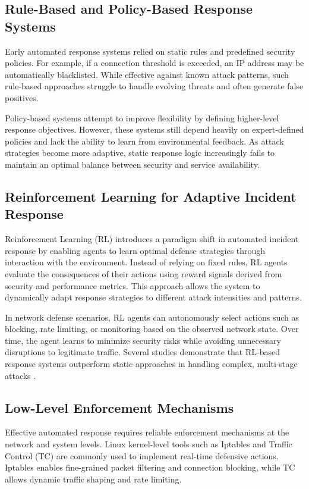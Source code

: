\documentclass[12pt,a4paper]{report}
\begin{document}
\subsection{Rule-Based and Policy-Based Response Systems}

Early automated response systems relied on static rules and predefined security policies.
For example, if a connection threshold is exceeded, an IP address may be automatically blacklisted.
While effective against known attack patterns, such rule-based approaches struggle to handle evolving threats and often generate false positives.

Policy-based systems attempt to improve flexibility by defining higher-level response objectives.
However, these systems still depend heavily on expert-defined policies and lack the ability to learn from environmental feedback.
As attack strategies become more adaptive, static response logic increasingly fails to maintain an optimal balance between security and service availability.

\subsection{Reinforcement Learning for Adaptive Incident Response}

Reinforcement Learning (RL) introduces a paradigm shift in automated incident response by enabling agents to learn optimal defense strategies through interaction with the environment.
Instead of relying on fixed rules, RL agents evaluate the consequences of their actions using reward signals derived from security and performance metrics.
This approach allows the system to dynamically adapt response strategies to different attack intensities and patterns.

In network defense scenarios, RL agents can autonomously select actions such as blocking, rate limiting, or monitoring based on the observed network state.
Over time, the agent learns to minimize security risks while avoiding unnecessary disruptions to legitimate traffic.
Several studies demonstrate that RL-based response systems outperform static approaches in handling complex, multi-stage attacks \cite{lopez2020application,nguyen2021deep}.

\subsection{Low-Level Enforcement Mechanisms}

Effective automated response requires reliable enforcement mechanisms at the network and system levels.
Linux kernel-level tools such as Iptables and Traffic Control (TC) are commonly used to implement real-time defensive actions.
Iptables enables fine-grained packet filtering and connection blocking, while TC allows dynamic traffic shaping and rate limiting.
\end{document}
